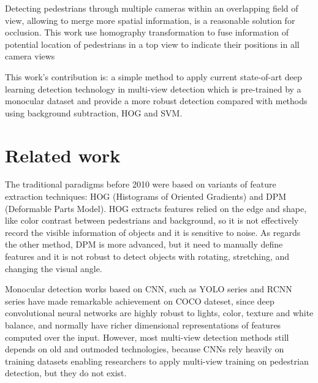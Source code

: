 \documentclass[journal]{IEEEtran}
\begin{document}
Detecting pedestrians through multiple cameras within an overlapping field of view, allowing to merge more spatial information, is a reasonable solution for occlusion. This work use homography transformation to fuse information of potential location of pedestrians in a top view to indicate their positions in all camera views



This work's contribution is: a simple method to apply current state-of-art deep learning detection technology in multi-view detection which is pre-trained by a monocular dataset and provide a more robust detection compared with methods using background subtraction, HOG and SVM.
\section{Related work}
The traditional paradigms before 2010 were based on variants of  feature extraction techniques: HOG (Histograms of Oriented Gradients) and DPM (Deformable Parts Model). HOG extracts features relied on the edge and shape, like color contrast between pedestrians and background, so it is not effectively record the visible information of objects and it is sensitive to noise. As regards the other method, DPM is more advanced, but it need to manually define features and it is not robust to detect objects with rotating, stretching, and changing the visual angle.

Monocular detection works based on CNN, such as YOLO series and RCNN series have made remarkable achievement on COCO dateset, since deep convolutional neural networks are highly robust to lights, color, texture and white balance, and normally have richer dimensional representations of features computed over the input. However, most multi-view detection methods still depends on old and outmoded technologies, because CNNs rely heavily on training datasets enabling researchers to apply multi-view training on pedestrian detection, but they do not exist.




%
%
\end{document}
